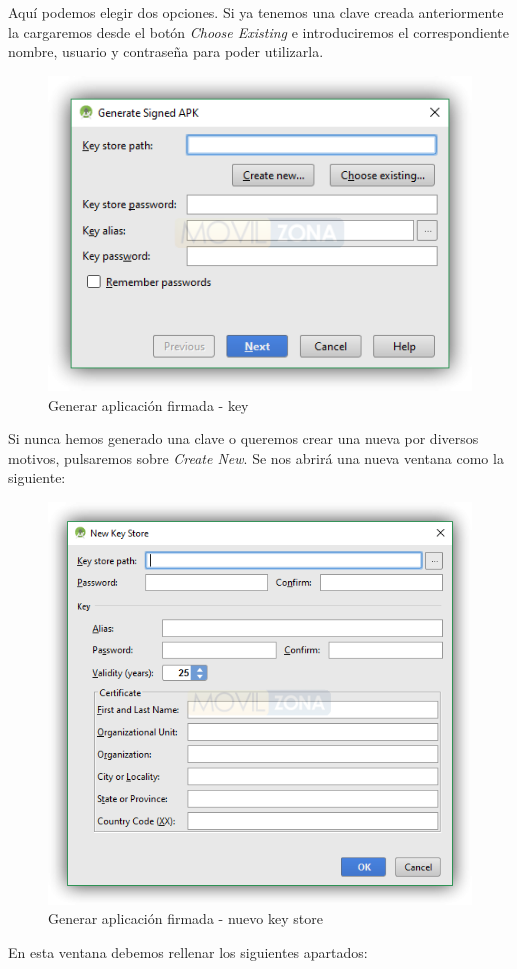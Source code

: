 Aquí podemos elegir dos opciones. Si ya tenemos una clave creada anteriormente la cargaremos desde el botón \textit{Choose Existing} e introduciremos el correspondiente nombre, usuario y contraseña para poder utilizarla. 

\begin{figure}[H]
	\centering
	\includegraphics[width=0.6\linewidth]{figuras/build-2}
	\caption{Generar aplicación firmada - key}
	\label{fig:bld2}
\end{figure}

Si nunca hemos generado una clave o queremos crear una nueva por diversos motivos, pulsaremos sobre \textit{Create New}.
Se nos abrirá una nueva ventana como la siguiente:

\begin{figure}[H]
	\centering
	\includegraphics[width=0.6\linewidth]{figuras/build-3}
	\caption{Generar aplicación firmada - nuevo key store}
	\label{fig:bld3}
\end{figure}

En esta ventana debemos rellenar los siguientes apartados:

